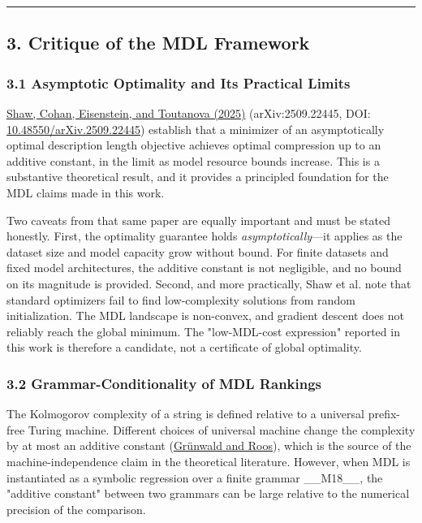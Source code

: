 \noindent\rule{\textwidth}{0.4pt}

\subsection{3. Critique of the MDL Framework}

\subsubsection{3.1 Asymptotic Optimality and Its Practical Limits}

\href{https://arxiv.org/abs/2509.22445}{Shaw, Cohan, Eisenstein, and Toutanova (2025)} (arXiv:2509.22445, DOI: \href{https://doi.org/10.48550/arXiv.2509.22445}{10.48550/arXiv.2509.22445}) establish that a minimizer of an asymptotically optimal description length objective achieves optimal compression up to an additive constant, in the limit as model resource bounds increase. This is a substantive theoretical result, and it provides a principled foundation for the MDL claims made in this work.

Two caveats from that same paper are equally important and must be stated honestly. First, the optimality guarantee holds \textit{asymptotically}---it applies as the dataset size and model capacity grow without bound. For finite datasets and fixed model architectures, the additive constant is not negligible, and no bound on its magnitude is provided. Second, and more practically, Shaw et al. note that standard optimizers fail to find low-complexity solutions from random initialization. The MDL landscape is non-convex, and gradient descent does not reliably reach the global minimum. The "low-MDL-cost expression" reported in this work is therefore a candidate, not a certificate of global optimality.

\subsubsection{3.2 Grammar-Conditionality of MDL Rankings}

The Kolmogorov complexity of a string is defined relative to a universal prefix-free Turing machine. Different choices of universal machine change the complexity by at most an additive constant (\href{https://homepages.cwi.nl/~paulv/papers/mdlindbayeskolmcompl.pdf}{Grünwald and Roos}), which is the source of the machine-independence claim in the theoretical literature. However, when MDL is instantiated as a symbolic regression over a finite grammar \_\_M18\_\_, the "additive constant" between two grammars can be large relative to the numerical precision of the comparison.

